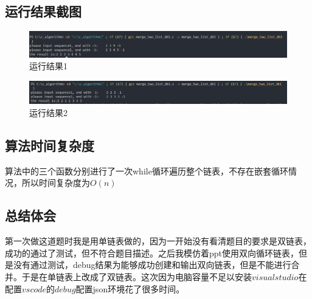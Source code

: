 \documentclass[UTF8]{ctexart}
\begin{document}
	\subsection{运行结果截图}
\begin{figure}[!htbp]
	\centering
	\includegraphics[scale=0.65]{dbl.png}
	\caption{运行结果1}
\end{figure}
\begin{figure}[!htbp]
	\centering
	\includegraphics[scale=0.65]{test2.png}
	\caption{运行结果2}
\end{figure}
%	
	\subsection{算法时间复杂度}
    算法中的三个函数分别进行了一次while循环遍历整个链表，不存在嵌套循环情况，所以时间复杂度为$O(n)$
	\subsection{总结体会}
	\indent 第一次做这道题时我是用单链表做的，因为一开始没有看清题目的要求是双链表，成功的通过了测试，但不符合题目描述。之后我模仿着ppt使用双向循环链表，但是没有通过测试，debug结果为能够成功创建和输出双向链表，但是不能进行合并。于是在单链表上改成了双链表。这次因为电脑容量不足以安装$visual studio$在配置$vscode$的$debug$配置json环境花了很多时间。
\end{document}
